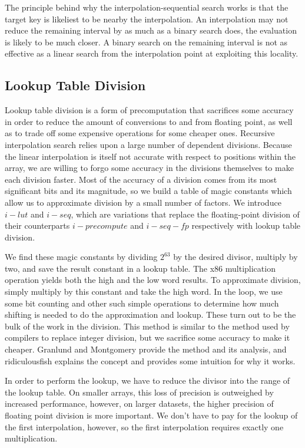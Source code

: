 \documentclass[twocolumn]{article}
\begin{document}
The principle behind why the interpolation-sequential search works is that the target key is likeliest to be nearby the interpolation. An interpolation may not reduce the remaining interval by as much as a binary search does, the evaluation is likely to be much closer. A binary search on the remaining interval is not as effective as a linear search from the interpolation point at exploiting this locality.

\subsection{Lookup Table Division}
\label{lut}
Lookup table division is a form of precomputation that sacrifices some accuracy in order to reduce the amount of conversions to and from floating point, as well as to trade off some expensive operations for some cheaper ones. Recursive interpolation search relies upon a large number of dependent divisions. Because the linear interpolation is itself not accurate with respect to positions within the array, we are willing to forgo some accuracy in the divisions themselves to make each division faster. Most of the accuracy of a division comes from its most significant bits and its magnitude, so we build a table of magic constants which allow us to approximate division by a small number of factors. We introduce $i-lut$ and $i-seq$, which are variations that replace the floating-point division of their counterparts $i-precompute$ and $i-seq-fp$ respectively with lookup table division.

We find these magic constants by dividing $2^63$ by the desired divisor, multiply by two, and save the result constant in a lookup table. The x86 multiplication operation yields both the high and the low word results. To approximate division, simply multiply by this constant and take the high word. In the loop, we use some bit counting and other such simple operations to determine how much shifting is needed to do the approximation and lookup. These turn out to be the bulk of the work in the division. This method is similar to the method used by compilers to replace integer division, but we sacrifice some accuracy to make it cheaper. Granlund and Montgomery \cite{granlund-montgomery} provide the method and its analysis, and ridiculousfish \cite{fish} explains the concept and provides some intuition for why it works.

In order to perform the lookup, we have to reduce the divisor into the range of the lookup table. On smaller arrays, this loss of precision is outweighed by increased performance, however, on larger datasets, the higher precision of floating point division is more important. We don't have to pay for the lookup of the first interpolation, however, so the first interpolation requires exactly one multiplication.
\end{document}
